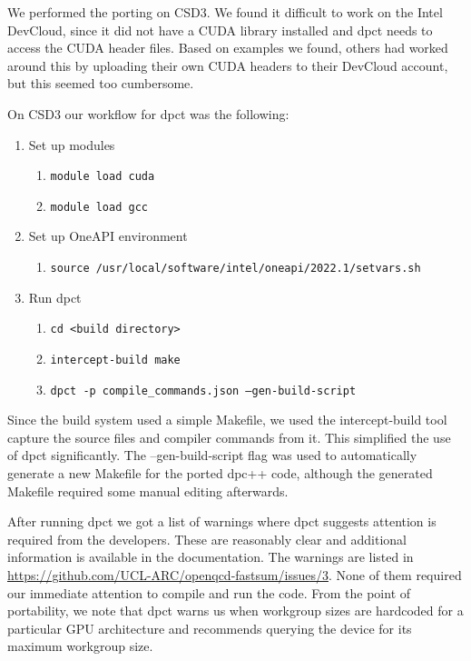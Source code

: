 We performed the porting on CSD3. We found it difficult to work on the Intel DevCloud, since it did not have a CUDA library installed and dpct needs to access the CUDA header files.  Based on examples we found, others had worked around this by uploading their own CUDA headers to their DevCloud account, but this seemed too cumbersome.

On CSD3 our workflow for dpct was the following:

\begin{enumerate}
	\item Set up modules
	      \begin{enumerate}
		      \item\texttt{module load cuda}
		      \item\texttt{module load gcc}
	      \end{enumerate}
	\item Set up OneAPI environment
	      \begin{enumerate}
		      \item\texttt{source /usr/local/software/intel/oneapi/2022.1/setvars.sh}
	      \end{enumerate}
	\item Run dpct
	      \begin{enumerate}
		      \item\texttt{cd <build directory>}
		      \item\texttt{intercept-build make}
		      \item\texttt{dpct -p compile\_commands.json --gen-build-script}
	      \end{enumerate}
\end{enumerate}

Since the build system used a simple Makefile, we used the intercept-build tool capture the source files and compiler commands from it. This simplified the use of dpct significantly. The --gen-build-script flag was used to automatically generate a new Makefile for the ported dpc++ code, although the generated Makefile required some manual editing afterwards.

After running dpct we got a list of warnings where dpct suggests attention is required from the developers. These are reasonably clear and additional information is available in the documentation. The warnings are listed in \url{https://github.com/UCL-ARC/openqcd-fastsum/issues/3}. None of them required our immediate attention to compile and run the code. From the point of portability, we note that dpct warns us when workgroup sizes are hardcoded for a particular GPU architecture and recommends querying the device for its maximum workgroup size.


